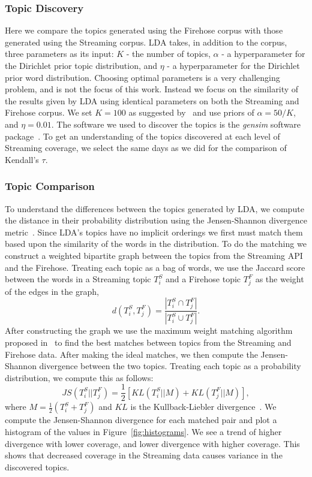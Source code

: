 \documentclass[letterpaper]{article}
\begin{document}
\subsubsection{Topic Discovery}
Here we compare the topics generated using the Firehose corpus with those generated using the Streaming corpus. LDA takes, in addition to the corpus, three parameters as its input: $K$ - the number of topics, $\alpha$ - a hyperparameter for the Dirichlet prior topic distribution, and $\eta$ - a hyperparameter for the Dirichlet prior word distribution. Choosing optimal parameters is a very challenging problem, and is not the focus of this work. Instead we focus on the similarity of the results given by LDA using identical parameters on both the Streaming and Firehose corpus. We set $K = 100$ as suggested by~\cite{Duma88} and use priors of $\alpha = 50/K$, and $\eta = 0.01$. The software we used to discover the topics is the {\em gensim} software package~\cite{gensim}. To get an understanding of the topics discovered at each level of Streaming coverage, we select the same days as we did for the comparison of Kendall's $\tau$.

\subsubsection{Topic Comparison}
To understand the differences between the topics generated by LDA, we compute the distance in their probability distribution using the Jensen-Shannon divergence metric~\cite{Lin91}. Since LDA's topics have no implicit orderings we first must match them based upon the similarity of the words in the distribution. To do the matching we construct a weighted bipartite graph between the topics from the Streaming API and the Firehose. Treating each topic as a bag of words, we use the Jaccard score between the words in a Streaming topic $T^S_i$ and a Firehose topic $T^F_j$ as the weight of the edges in the graph,
\begin{equation}
  d(T^S_i, T^F_j) = \frac{|T^S_i \cap T^F_j|}{|T^S_i \cup T^F_j|}.
\end{equation}
After constructing the graph we use the maximum weight matching algorithm proposed in~\cite{Gali86} to find the best matches between topics from the Streaming and Firehose data. After making the ideal matches, we then compute the Jensen-Shannon divergence between the two topics. Treating each topic as a probability distribution, we compute this as follows:
\begin{equation}
JS(T^S_i || T^F_j) = \frac{1}{2}[KL(T^S_i || M) + KL(T^F_j || M)],
\end{equation}
where $M = \frac{1}{2}(T^S_i + T^F_j)$ and $KL$ is the Kullback-Liebler divergence~\cite{cove06}. We compute the Jensen-Shannon divergence for each matched pair and plot a histogram of the values in Figure~\ref{fig:histograms}. We see a trend of higher divergence with lower coverage, and lower divergence with higher coverage. This shows that decreased coverage in the Streaming data causes variance in the discovered topics.
\end{document}
